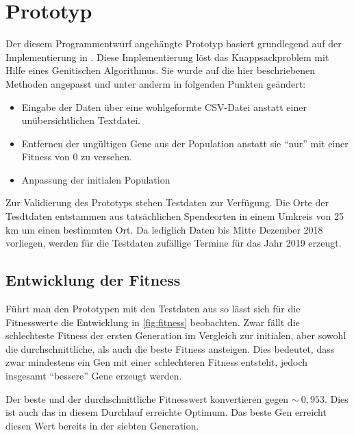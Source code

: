 \section{Prototyp}\label{sec:prototyp}

Der diesem Programmentwurf angehängte Prototyp basiert grundlegend auf der Implementierung in \cite{Quiz15Th91:online}.
Diese Implementierung löst das Knappsackproblem mit Hilfe eines Genitischen Algorithmus.
Sie wurde auf die hier beschriebenen Methoden angepasst und unter anderm
in folgenden Punkten geändert:
\begin{itemize}
    \item Eingabe der Daten über eine wohlgeformte CSV-Datei anstatt einer unübersichtlichen Textdatei.
    \item Entfernen der ungültigen Gene aus der Population anstatt sie \enquote{nur} mit einer Fitness von $0$ zu versehen.
    \item Anpassung der initialen Population
\end{itemize}


\noindent
Zur Validierung des Prototyps stehen Testdaten zur Verfügung.
Die Orte der Tesdtdaten entstammen aus tatsächlichen Spendeorten in einem Umkreis von 25 km um einen bestimmten Ort.
Da lediglich Daten bis Mitte Dezember 2018 vorliegen,
werden für die Testdaten zufällige Termine für das Jahr 2019 erzeugt.



\subsection{Entwicklung der Fitness}

Führt man den Prototypen mit den Testdaten aus so lässt sich für die Fitnesswerte die Entwicklung in \autoref{fig:fitness} beobachten.
Zwar fällt die schlechteste Fitness der ersten Generation im Vergleich zur initialen,
aber sowohl die durchschnittliche, als auch die beste Fitness ansteigen.
Dies bedeutet, dass zwar mindestens ein Gen mit einer schlechteren Fitness entsteht,
jedoch insgesamt \enquote{bessere} Gene erzeugt werden.

Der beste und der durchschnittliche Fitnesswert konvertieren gegen $\sim~0,953$.
Dies ist auch das in diesem Durchlauf erreichte Optimum.
Das beste Gen erreicht diesen Wert bereits in der siebten Generation.

